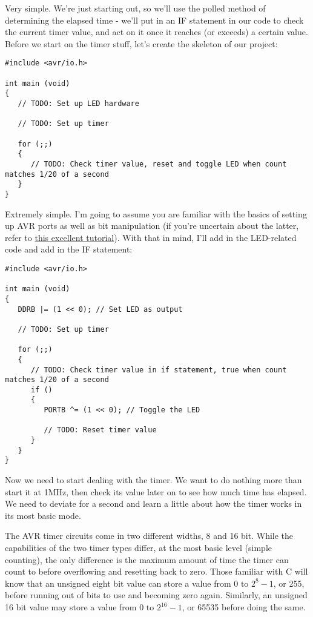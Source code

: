 \documentclass[a4paper,oneside]{book}
\begin{document}
Very simple. We're just starting out, so we'll use the polled method of determining the elapsed time - we'll put in an IF statement in our code to check the current timer value, and act on it once it reaches (or exceeds) a certain value. Before we start on the timer stuff, let's create the skeleton of our project: 

\begin{center}
\begin{lstlisting}
#include <avr/io.h>

int main (void)
{
   // TODO: Set up LED hardware

   // TODO: Set up timer

   for (;;)
   {
      // TODO: Check timer value, reset and toggle LED when count matches 1/20 of a second
   }
} 
\end{lstlisting}
\end{center}

Extremely simple. I'm going to assume you are familiar with the basics of setting up AVR ports as well as bit manipulation (if you're uncertain about the latter, refer to \href{http://www.avrfreaks.net/index.php?name=PNphpBB2&file=viewtopic&t=37871}{this excellent tutorial}). With that in mind, I'll add in the LED-related code and add in the IF statement: 

\begin{center}
\begin{lstlisting}
#include <avr/io.h>

int main (void)
{
   DDRB |= (1 << 0); // Set LED as output

   // TODO: Set up timer

   for (;;)
   {
      // TODO: Check timer value in if statement, true when count matches 1/20 of a second
      if ()
      {
         PORTB ^= (1 << 0); // Toggle the LED

         // TODO: Reset timer value
      }
   }
} 
\end{lstlisting}
\end{center}

Now we need to start dealing with the timer. We want to do nothing more than start it at 1MHz, then check its value later on to see how much time has elapsed. We need to deviate for a second and learn a little about how the timer works in its most basic mode.

The AVR timer circuits come in two different widths, 8 and 16 bit. While the capabilities of the two timer types differ, at the most basic level (simple counting), the only difference is the maximum amount of time the timer can count to before overflowing and resetting back to zero. Those familiar with C will know that an unsigned eight bit value can store a value from \(0 \text{ to } 2^{8}-1\), or 255, before running out of bits to use and becoming zero again. Similarly, an unsigned 16 bit value may store a value from \(0 \text{ to } 2^{16}-1\), or 65535 before doing the same.
\end{document}
